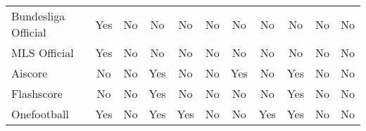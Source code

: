 \begin{table}[h!]
\begin{tabular}{|l|c|c|c|c|c|c|c|c|c|c|}
Bundesliga Official   & Yes                    & No                  & No              & No                   & No                    & No                    & No                 & No                  & No                  & No                   \\
MLS Official          & Yes                    & No                  & No              & No                   & No                    & No                    & No                 & No                  & No                  & No                   \\
Aiscore               & No                     & No                  & Yes             & No                   & No                    & Yes                   & No                 & Yes                 & No                  & No                   \\
Flashscore            & No                     & No                  & Yes             & No                   & No                    & No                    & No                 & Yes                 & No                  & No                   \\
Onefootball           & Yes                    & No                  & Yes             & Yes                  & No                    & No                    & Yes                & Yes                 & No                  & No                   \\
\hline
\end{tabular}
\end{table}



